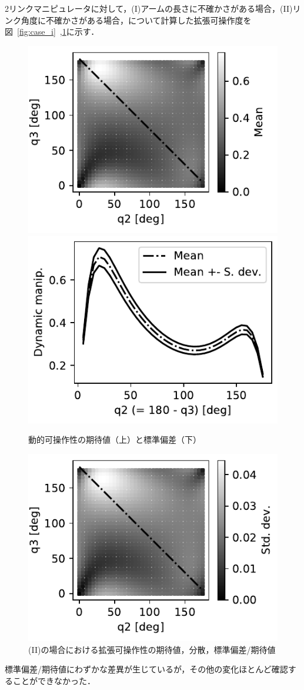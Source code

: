 \documentclass[10pt,a4j,twocolumn]{ltjsarticle}
\begin{document}
2リンクマニピュレータに対して，(I)アームの長さに不確かさがある場合，(II)リンク角度に不確かさがある場合，について計算した拡張可操作度を図~\ref{fig:case_i}~,\ref{fig:case_ii}に示す．
\begin{figure}
  \centering
  \includegraphics[width=80truemm]{./dm_mean.pdf}
  \includegraphics[width=80truemm]{./dm_dist.pdf}
  \caption{動的可操作性の期待値（上）と標準偏差（下）}
  \label{fig:case_i}
  \includegraphics[width=80truemm]{./dm_std.pdf}
  \caption{(II)の場合における拡張可操作性の期待値，分散，標準偏差/期待値}
  \label{fig:case_ii}
\end{figure}
標準偏差/期待値にわずかな差異が生じているが，その他の変化ほとんど確認することができなかった．
\end{document}
